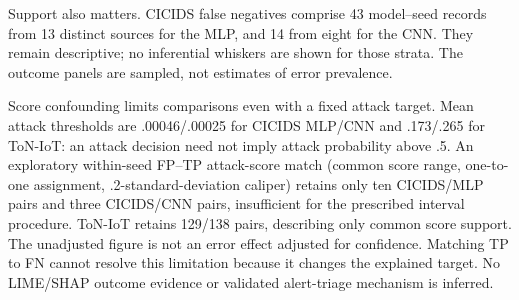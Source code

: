 Support also matters. CICIDS false negatives comprise 43 model--seed records
from 13 distinct sources for the MLP, and 14 from eight for the CNN.
They remain descriptive; no inferential whiskers are shown for those strata.
The outcome panels are sampled, not estimates of error prevalence.

Score confounding limits comparisons even with a fixed attack target.
Mean attack thresholds are .00046/.00025 for CICIDS MLP/CNN and .173/.265
for ToN-IoT: an attack decision need not imply attack probability above .5.
An exploratory within-seed FP--TP attack-score match (common score range,
one-to-one assignment, .2-standard-deviation caliper) retains only ten CICIDS/MLP pairs and three
CICIDS/CNN pairs, insufficient for the prescribed interval procedure.
ToN-IoT retains 129/138 pairs, describing only common score support.
The unadjusted figure is not an error effect adjusted for confidence.
Matching TP to FN cannot resolve this limitation because it changes the
explained target. No LIME/SHAP outcome evidence or validated alert-triage
mechanism is inferred.
